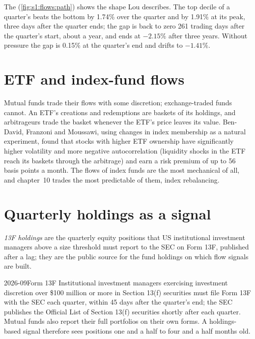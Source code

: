 The  (\cref{fig:s1:flows:path}) shows the shape Lou describes. The top decile of a quarter's  beats the bottom by 1.74\% over the
quarter and by 1.91\% at its peak, three days after the quarter ends; the gap is back to zero 261 trading days after the quarter's start, about a year, and ends at $-2.15\%$ after
three years. Without pressure the gap is 0.15\% at the quarter's end and drifts to $-1.41\%$.

\section{ETF and index-fund flows}

Mutual funds trade their flows with some discretion; exchange-traded funds cannot. An ETF's creations and redemptions are baskets of its holdings, and
arbitrageurs trade the basket whenever the ETF's price leaves its value. Ben-David, Franzoni and Moussawi, using changes in index membership as a natural
experiment, found that stocks with higher ETF ownership have significantly higher volatility and more negative autocorrelation (liquidity shocks in the ETF
reach its baskets through the arbitrage) and earn a risk premium of up to 56 basis points a month. The flows of index funds are the most mechanical of all,
and chapter~10 trades the most predictable of them, index rebalancing.

\section{Quarterly holdings as a signal}

\begin{definition}[13F holdings]\label{def:s1:flows:13f}
\emph{13F holdings} are the quarterly equity positions that US institutional investment managers above a size threshold must report to
the SEC on Form 13F, published after a lag; they are the public source for the fund holdings on which flow signals are built.
\end{definition}

\begin{dated}{2026-09}{Form 13F}\label{dat:s1:flows:13f}
Institutional investment managers exercising investment discretion over \$100 million or more in Section 13(f) securities must file Form 13F with the SEC
each quarter, within 45 days after the quarter's end; the SEC publishes the Official List of Section 13(f) securities shortly after each quarter. Mutual
funds also report their full portfolios on their own forms. A holdings-based signal therefore sees positions one and a half to four and a half months old.
\end{dated}

